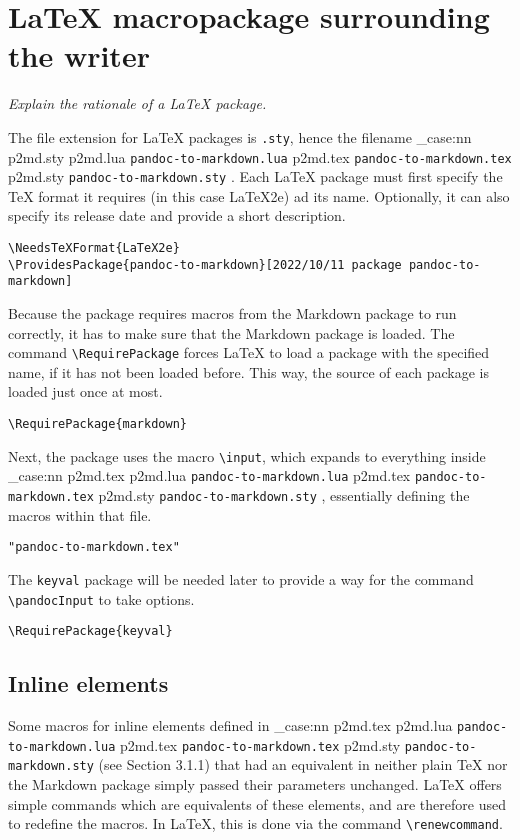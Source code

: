 \documentclass[
  digital,     %
  oneside,     %
  nosansbold,  %
  nocolorbold, %
  lof,         %
  nolot,       %
]{fithesis4}
\newcommand\macro[1]{\texttt{\textbackslash{}{#1}}}
\newcommand\file[1]
  {
    \str_case:nn
      { #1 }
      {
        { p2md.lua } { \texttt{pandoc\hyp{}to\hyp{}markdown.lua} }
        { p2md.tex } { \texttt{pandoc\hyp{}to\hyp{}markdown.tex} }
        { p2md.sty } { \texttt{pandoc\hyp{}to\hyp{}markdown.sty} }
      }
  }
\begin{document}
\section{\LaTeX{} macropackage surrounding the writer}
\emph{Explain the rationale of a \LaTeX{} package.}

\bigskip
The file extension for \LaTeX{} packages is \texttt{.sty}, hence the filename \file{p2md.sty}.
\noindent
Each \LaTeX{} package must first specify the \TeX{} format it requires (in this case \LaTeX{}2e) ad its name. Optionally, it can also specify its release date and provide a short description.

\noindent
\lstset{language=[LaTeX]TeX}
\begin{lstlisting}
\NeedsTeXFormat{LaTeX2e}
\ProvidesPackage{pandoc-to-markdown}[2022/10/11 package pandoc-to-markdown]
\end{lstlisting}

\noindent
Because the package requires macros from the Markdown package to run correctly, it has to make sure that the Markdown package is loaded. The command \macro{RequirePackage} forces \LaTeX{} to load a package with the specified name, if it has not been loaded before. This way, the source of each package is loaded just once at most.

\noindent
\lstset{language=[LaTeX]TeX}
\begin{lstlisting}
\RequirePackage{markdown}
\end{lstlisting}

\noindent
Next, the package uses the macro \macro{input}, which expands to everything inside \file{p2md.tex}, essentially defining the macros within that file.

\noindent
\lstset{language=[LaTeX]TeX}
\begin{lstlisting}
"pandoc-to-markdown.tex"
\end{lstlisting}

\noindent
The \texttt{keyval} package will be needed later to provide a way for the command \macro{pandocInput} to take options.

\noindent
\lstset{language=[LaTeX]TeX}
\begin{lstlisting}
\RequirePackage{keyval}
\end{lstlisting}

\subsection{Inline elements}
Some macros for inline elements defined in \file{p2md.tex} (see Section 3.1.1) that had an equivalent in neither plain \TeX{} nor the Markdown package simply passed their parameters unchanged. \LaTeX{} offers simple commands which are equivalents of these elements, and are therefore used to redefine the macros. In \LaTeX{}, this is done via the command \macro{renewcommand}.
\end{document}
